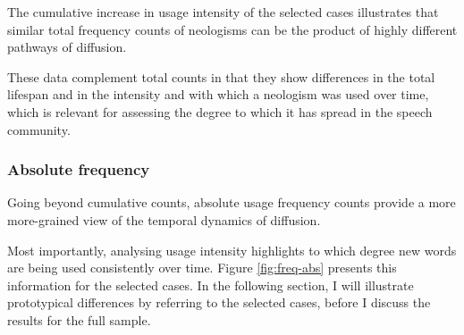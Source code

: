 \documentclass[
  a4paper,
  abstract=on,
  captions=tableabove
  ]{scrartcl}
\begin{document}
      The cumulative increase in usage intensity of the selected cases illustrates that similar total frequency counts of neologisms can be the product of highly different pathways of diffusion.

      These data complement total counts in that they show differences in the total lifespan and in the intensity and with which a neologism was used over time, which is relevant for assessing the degree to which it has spread in the speech community.


    \subsubsection{Absolute frequency}

      Going beyond cumulative counts, absolute usage frequency counts provide a more more-grained view of the temporal dynamics of diffusion.


      Most importantly, analysing usage intensity highlights to which degree new words are being used consistently over time. Figure \ref{fig:freq-abs} presents this information for the selected cases. In the following section, I will illustrate prototypical differences by referring to the selected cases, before I discuss the results for the full sample.
\end{document}
